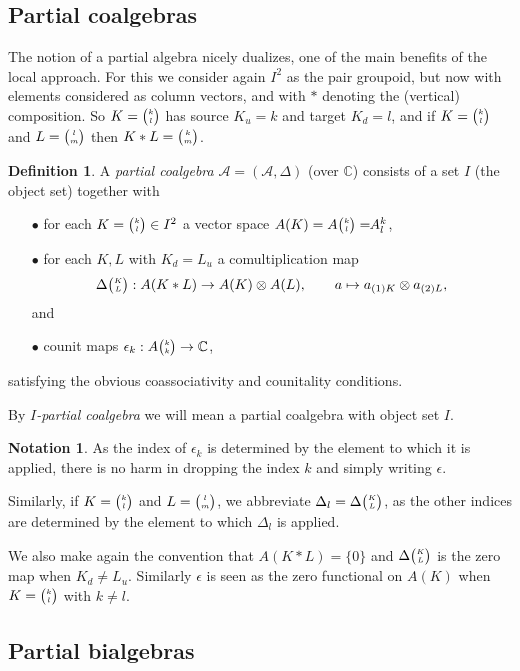 \documentclass[10pt]{article}
\newcommand{\C}{\mathbb{C}}
\newcommand{\Grt}[3]{#1{\tiny{\begin{pmatrix} #2\\#3\end{pmatrix}}}}
\newcommand{\GrRA}[3]{#1^{#2}_{#3}} %
\newcommand{\Grru}[2]{{\tiny \begin{pmatrix} #1 \\ #2\end{pmatrix}}}
\newcommand{\bmult}{*}
\theoremstyle{definition}
\newtheorem{Def}[Theorem]{Definition}
\newtheorem{Not}[Theorem]{Notation}
\numberwithin{equation}{section}
\begin{document}
\subsection{Partial coalgebras}

The notion of  a partial algebra nicely dualizes, one of the main benefits of the local approach. For this we consider again $I^2$ as the pair groupoid, but now with elements considered as column vectors, and with $\bmult$ denoting the (vertical) composition. So $K=\Grt{}{k}{l}$ has source $K_u = k$ and target $K_d = l$, and if $K=\Grt{}{k}{l}$ and $L=\Grt{}{l}{m}$ then $K\bmult L = \Grt{}{k}{m}$.

\begin{Def} A \emph{partial coalgebra} $\mathscr{A}=(\mathscr{A},\Delta)$ (over $\C$) consists of a set $I$ (the object set) together with 
\begin{itemize}
\item[$\bullet$] for each $K=\Grru{k}{l}\in I^2$ a vector space $A(K) = \Grt{A}{k}{l}=\!\!\GrRA{A}{k}{l}$,
\item[$\bullet$] for each $K,L$ with $K_d = L_u$ a comultiplication map \[\Grt{\Delta}{K}{L}:A(K*L)\rightarrow A(K)\otimes A(L),\qquad a \mapsto a_{(1)K}\otimes a_{(2)L},\] and 
\item[$\bullet$] counit maps $\epsilon_k:\Grt{A}{k}{k}\rightarrow \C$,
\end{itemize} 
satisfying the obvious coassociativity and counitality conditions.

By \emph{$I$-partial coalgebra} we will mean a partial coalgebra with object set $I$.
\end{Def}

\begin{Not}\label{NotCom} As the index of $\epsilon_k$ is determined by the element to which it is applied, there is no harm in dropping the index $k$ and simply writing $\epsilon$.

Similarly, if $K = \Grt{}{k}{l}$ and $L = \Grt{}{l}{m}$, we abbreviate $\Delta_l = \Grt{\Delta}{K}{L}$, as the other indices are determined by the element to which $\Delta_l$ is applied.
\end{Not}

We also make again the convention that $A(K*L)=\{0\}$ and
$\Grt{\Delta}{K}{L}$ is the zero map when $K_d \neq L_u$. Similarly $\epsilon$ is seen as the zero functional on $A(K)$ when $K=\Grt{}{k}{l}$ with $k\neq l$. 

\subsection{Partial bialgebras}
\end{document}
